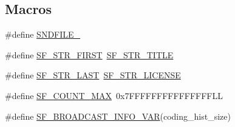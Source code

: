 \subsection*{Macros}
\begin{DoxyCompactItemize}
\item 
\#define \hyperlink{mac_2config_2i386_2lib-src_2libsndfile_2src_2sndfile_8h_a01907163d623742301e6475255653414}{S\+N\+D\+F\+I\+L\+E\+\_}
\item 
\#define \hyperlink{mac_2config_2i386_2lib-src_2libsndfile_2src_2sndfile_8h_a4e4fb6e7419fa77d21641397c5afd702}{S\+F\+\_\+\+S\+T\+R\+\_\+\+F\+I\+R\+ST}~\hyperlink{win_2_projects_2libsndfile_2sndfile_8h_a3b39f0c6258619f350327586d1c22cadacc0345590e46aa4c2ebd284d7becde48}{S\+F\+\_\+\+S\+T\+R\+\_\+\+T\+I\+T\+LE}
\item 
\#define \hyperlink{mac_2config_2i386_2lib-src_2libsndfile_2src_2sndfile_8h_a8c6c81346fe61df488dd3231d4c90110}{S\+F\+\_\+\+S\+T\+R\+\_\+\+L\+A\+ST}~\hyperlink{win_2_projects_2libsndfile_2sndfile_8h_a3b39f0c6258619f350327586d1c22cada0374c0f8282517ebf72f96732a6de00a}{S\+F\+\_\+\+S\+T\+R\+\_\+\+L\+I\+C\+E\+N\+SE}
\item 
\#define \hyperlink{mac_2config_2i386_2lib-src_2libsndfile_2src_2sndfile_8h_a2a594c90b41e9b0140f28724f80b763a}{S\+F\+\_\+\+C\+O\+U\+N\+T\+\_\+\+M\+AX}~0x7\+F\+F\+F\+F\+F\+F\+F\+F\+F\+F\+F\+F\+F\+F\+F\+LL
\item 
\#define \hyperlink{mac_2config_2i386_2lib-src_2libsndfile_2src_2sndfile_8h_ac029684516383fab298a406c625a7d8d}{S\+F\+\_\+\+B\+R\+O\+A\+D\+C\+A\+S\+T\+\_\+\+I\+N\+F\+O\+\_\+\+V\+AR}(coding\+\_\+hist\+\_\+size)
\end{DoxyCompactItemize}
